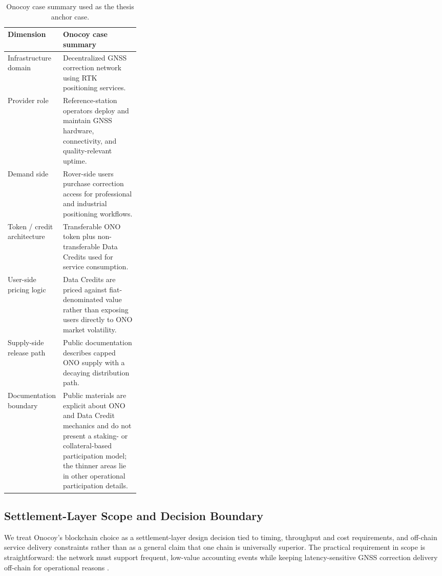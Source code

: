 \begin{table}[H]
    \centering
    \small
    \renewcommand{\arraystretch}{1.2}
    \begin{tabularx}{\textwidth}{@{}p{0.30\linewidth}X@{}}
        \toprule
        \textbf{Dimension} & \textbf{Onocoy case summary} \\
        \midrule
        Infrastructure domain & Decentralized GNSS correction network using RTK positioning services. \\
        Provider role & Reference-station operators deploy and maintain GNSS hardware, connectivity, and quality-relevant uptime. \\
        Demand side & Rover-side users purchase correction access for professional and industrial positioning workflows. \\
        Token / credit architecture & Transferable ONO token plus non-transferable Data Credits used for service consumption. \\
        User-side pricing logic & Data Credits are priced against fiat-denominated value rather than exposing users directly to ONO market volatility. \\
        Supply-side release path & Public documentation describes capped ONO supply with a decaying distribution path. \\
        Documentation boundary & Public materials are explicit about ONO and Data Credit mechanics and do not present a staking- or collateral-based participation model; the thinner areas lie in other operational participation details. \\
        \bottomrule
    \end{tabularx}
    \caption[Onocoy case summary]{Onocoy case summary used as the thesis anchor case.}
    \label{tab:v2_onocoy_case_summary}
\end{table}

\subsection{Settlement-Layer Scope and Decision Boundary}
We treat Onocoy's blockchain choice as a settlement-layer design decision tied to timing, throughput and cost requirements, and off-chain service delivery constraints rather than as a general claim that one chain is universally superior. The practical requirement in scope is straightforward: the network must support frequent, low-value accounting events while keeping latency-sensitive GNSS correction delivery off-chain for operational reasons \cite{OnocoyWhitepaper301, OnocoyToken}.

